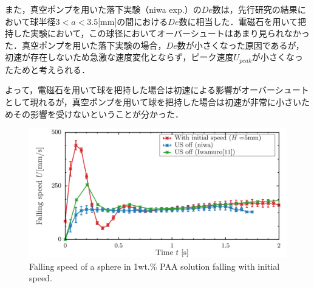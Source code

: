 また，真空ポンプを用いた落下実験（niwa exp.）の$De$数は，先行研究の結果において球半径$3<a<3.5$[mm]の間における$De$数に相当した．電磁石を用いて把持した実験において，この球径においてオーバーシュートはあまり見られなかった．真空ポンプを用いた落下実験の場合，$De$数が小さくなった原因であるが，初速が存在しないため急激な速度変化とならず，ピーク速度$U_{peak}$が小さくなったためと考えられる．

よって，電磁石を用いて球を把持した場合は初速による影響がオーバーシュートとして現れるが，真空ポンプを用いて球を把持した場合は初速が非常に小さいためその影響を受けないということが分かった．

\begin{figure}[ht]
    \begin{center}
        \includegraphics[width=15cm,clip]{5-Discussion/h-5.png}
        \caption{Falling speed of a sphere in 1wt.\% PAA solution falling with initial speed.}
        \label{fig:h-5}
    \end{center}
\end{figure}